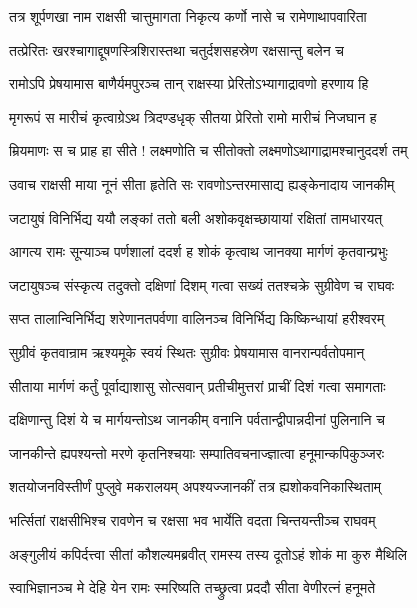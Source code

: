 \twolineshloka
{तत्र शूर्पणखा नाम राक्षसी चात्तुमागता}
{निकृत्य कर्णो नासे च रामेणाथापवारिता} %

\twolineshloka
{तत्प्रेरितः खरश्चागाद्दूषणस्त्रिशिरास्तथा}
{चतुर्दशसहस्रेण रक्षसान्तु बलेन च} %

\twolineshloka
{रामोऽपि प्रेषयामास बाणैर्यमपुरञ्च तान्}
{राक्षस्या प्रेरितोऽभ्यागाद्रावणो हरणाय हि} %

\twolineshloka
{मृगरूपं स मारीचं कृत्वाग्रेऽथ त्रिदण्डधृक्}
{सीतया प्रेरितो रामो मारीचं निजघान ह} %

\twolineshloka
{म्रियमाणः स च प्राह हा सीते ! लक्ष्मणोति च}
{सीतोक्तो लक्ष्मणोऽथागाद्रामश्चानुददर्श तम्} %

\twolineshloka
{उवाच राक्षसी माया नूनं सीता हृतेति सः}
{रावणोऽन्तरमासाद्य ह्यङ्केनादाय जानकीम्} %

\twolineshloka
{जटायुषं विनिर्भिद्य ययौ लङ्कां ततो बली}
{अशोकवृक्षच्छायायां रक्षितां तामधारयत्} %

\twolineshloka
{आगत्य रामः सून्याञ्च पर्णशालां ददर्श ह}
{शोकं कृत्वाथ जानक्या मार्गणं कृतवान्प्रभुः} %

\twolineshloka
{जटायुषञ्च संस्कृत्य तदुक्तो दक्षिणां दिशम्}
{गत्वा सख्यं ततश्चक्रे सुग्रीवेण च राघवः} %

\twolineshloka
{सप्त तालान्विनिर्भिद्य शरेणानतपर्वणा}
{वालिनञ्च विनिर्भिद्य किष्किन्धायां हरीश्वरम्} %

\twolineshloka
{सुग्रीवं कृतवान्राम ऋश्यमूके स्वयं स्थितः}
{सुग्रीवः प्रेषयामास वानरान्पर्वतोपमान्} %

\twolineshloka
{सीताया मार्गणं कर्तुं पूर्वाद्याशासु सोत्सवान्}
{प्रतीचीमुत्तरां प्राचीं दिशं गत्वा समागताः} %

\twolineshloka
{दक्षिणान्तु दिशं ये च मार्गयन्तोऽथ जानकीम्}
{वनानि पर्वतान्द्वीपान्नदीनां पुलिनानि च} %

\twolineshloka
{जानकीन्ते ह्यपश्यन्तो मरणे कृतनिश्चयाः}
{सम्पातिवचनाज्ज्ञात्वा हनूमान्कपिकुञ्जरः} %

\twolineshloka
{शतयोजनविस्तीर्णं पुप्लुवे मकरालयम्}
{अपश्यज्जानकीं तत्र ह्यशोकवनिकास्थिताम्} %

\twolineshloka
{भर्त्सितां राक्षसीभिश्च रावणेन च रक्षसा}
{भव भार्येति वदता चिन्तयन्तीञ्च राघवम्} %

\twolineshloka
{अङ्गुलीयं कपिर्दत्त्वा सीतां कौशल्यमब्रवीत्}
{रामस्य तस्य दूतोऽहं शोकं मा कुरु मैथिलि} %

\twolineshloka
{स्वाभिज्ञानञ्च मे देहि येन रामः स्मरिष्यति}
{तच्छ्रुत्वा प्रददौ सीता वेणीरत्नं हनूमते} %


